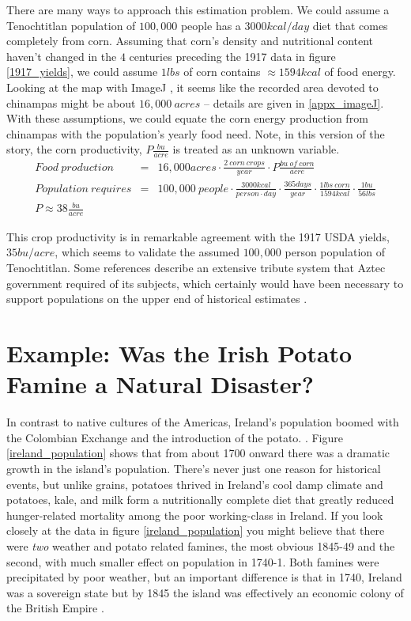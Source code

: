 \documentclass[prb,preprint]{revtex4-2}
\newcommand{\bea}{\begin{eqnarray}}
\newcommand{\eea}{\end{eqnarray}}
\begin{document}
There are many ways to approach this estimation problem.  We could assume a Tenochtitlan population of $100,000$ people has a $3000kcal/day$ diet that comes completely from corn.  Assuming that corn's density and nutritional content haven't changed in the $4$ centuries preceding the 1917 data in figure \ref{1917_yields}, we could assume $1lbs$ of corn contains $\approx1594kcal$ of food energy.  
Looking at the map with ImageJ \cite{imageJ}, it seems like the recorded area devoted to chinampas might be about
$16,000~acres$ -- details are given in \ref{appx_imageJ}.
With these assumptions, we could equate the corn energy production from chinampas with the population's yearly food need. Note, in this version of the story, the corn productivity, $P\frac{bu}{acre}$ is treated as an unknown variable.  
\bea
Food~production &=& 16,000acres\cdot \frac{2~corn~crops}{year}\cdot P \frac{bu~of~corn}{acre} \nonumber \\
Population~requires &=& 100,000~people\cdot \frac{3000kcal}{person\cdot day}\cdot\frac{365days}{year}\cdot\frac{1lbs~corn}{1594kcal}\cdot\frac{1bu}{56lbs} \nonumber \\
P \approx 38\frac{bu}{acre} && 
\eea

This crop productivity is in remarkable agreement with the 1917 USDA yields, $35bu/acre$, which seems to validate the assumed $100,000$ person population of Tenochtitlan.  Some references \cite{Chinampas_1964} describe an extensive tribute system that Aztec government required of its subjects, which certainly would have been necessary to support populations on the upper end of historical estimates \cite{400k}.




\clearpage


\section{Example: Was the Irish Potato Famine a Natural Disaster?}
In contrast to native cultures of the Americas, Ireland's population boomed with the Colombian Exchange and the introduction of the potato. \cite{potato,little_ice_age}.  Figure \ref{ireland_population} shows that from about 1700 onward there was a dramatic growth in the island's population.  There's never just one reason for historical events, but unlike grains, potatoes thrived in Ireland's cool damp climate and potatoes, kale, and milk form a nutritionally complete diet that greatly reduced hunger-related mortality among the poor working-class in Ireland.  If you look closely at the data in figure \ref{ireland_population} you might believe that there were \textit{two} weather and potato related famines, the most obvious 1845-49 and the second, with much smaller effect on population in 1740-1.  Both famines were precipitated by poor weather, but an important difference is that in 1740, Ireland was a sovereign state but by 1845 the island was effectively an economic colony of the British Empire \cite{little_ice_age}.  
\end{document}
